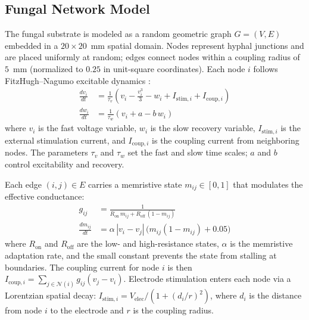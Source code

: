 \documentclass[letterpaper]{article}
\begin{document}
\subsection{Fungal Network Model}
The fungal substrate is modeled as a random geometric graph $G = (V, E)$ embedded in a $20 \times 20$~mm spatial domain. Nodes represent hyphal junctions and are placed uniformly at random; edges connect nodes within a coupling radius of $5$~mm (normalized to $0.25$ in unit-square coordinates). Each node $i$ follows FitzHugh--Nagumo excitable dynamics \citep{fitzhugh1961impulses, nagumo1962active, izhikevich2006fitzhugh}:
\begin{align}
\frac{dv_i}{dt} &= \frac{1}{\tau_v}\left(v_i - \frac{v_i^3}{3} - w_i + I_{\mathrm{stim},i} + I_{\mathrm{coup},i}\right) \label{eq:fhn_v} \\
\frac{dw_i}{dt} &= \frac{1}{\tau_w}\left(v_i + a - b\,w_i\right) \label{eq:fhn_w}
\end{align}
where $v_i$ is the fast voltage variable, $w_i$ is the slow recovery variable, $I_{\mathrm{stim},i}$ is the external stimulation current, and $I_{\mathrm{coup},i}$ is the coupling current from neighboring nodes. The parameters $\tau_v$ and $\tau_w$ set the fast and slow time scales; $a$ and $b$ control excitability and recovery.

Each edge $(i,j) \in E$ carries a memristive state $m_{ij} \in [0,1]$ that modulates the effective conductance:
\begin{align}
g_{ij} &= \frac{1}{R_{\mathrm{on}}\,m_{ij} + R_{\mathrm{off}}\,(1 - m_{ij})} \label{eq:conductance} \\
\frac{dm_{ij}}{dt} &= \alpha \,|v_i - v_j|\,\bigl(m_{ij}(1-m_{ij}) + 0.05\bigr) \label{eq:memristor}
\end{align}
where $R_{\mathrm{on}}$ and $R_{\mathrm{off}}$ are the low- and high-resistance states, $\alpha$ is the memristive adaptation rate, and the small constant prevents the state from stalling at boundaries. The coupling current for node $i$ is then $I_{\mathrm{coup},i} = \sum_{j \in \mathcal{N}(i)} g_{ij}(v_j - v_i)$. Electrode stimulation enters each node via a Lorentzian spatial decay: $I_{\mathrm{stim},i} = V_{\mathrm{elec}} / (1 + (d_i/r)^2)$, where $d_i$ is the distance from node $i$ to the electrode and $r$ is the coupling radius.
\end{document}
